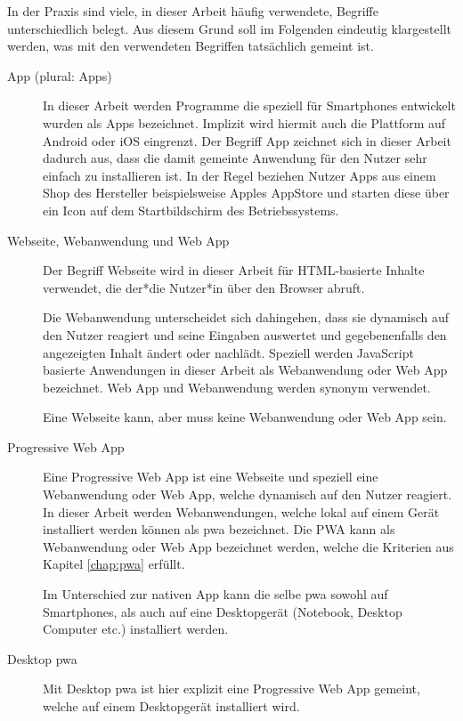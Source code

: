 In der Praxis sind viele, in dieser Arbeit häufig verwendete, Begriffe unterschiedlich belegt. Aus diesem Grund soll im Folgenden eindeutig klargestellt werden, was mit den verwendeten Begriffen tatsächlich gemeint ist.

\begin{description}
	\item [App (plural: Apps)]
		In dieser Arbeit werden Programme die speziell für Smartphones entwickelt wurden als Apps bezeichnet. Implizit wird hiermit auch die Plattform auf Android oder iOS eingrenzt. Der Begriff App zeichnet sich in dieser Arbeit dadurch aus, dass die damit gemeinte Anwendung für den Nutzer sehr einfach zu installieren ist. In der Regel beziehen Nutzer Apps aus einem Shop des Hersteller beispielsweise Apples AppStore und starten diese über ein Icon auf dem Startbildschirm des Betriebssystems.
		
	\item [Webseite, Webanwendung und Web App]
		Der Begriff Webseite wird in dieser Arbeit für HTML-basierte Inhalte verwendet, die der*die Nutzer*in über den Browser abruft.
		
		Die Webanwendung unterscheidet sich dahingehen, dass sie dynamisch auf den Nutzer reagiert und seine Eingaben auswertet und gegebenenfalls den angezeigten Inhalt ändert oder nachlädt. Speziell werden JavaScript basierte Anwendungen in dieser Arbeit als Webanwendung oder Web App bezeichnet. Web App und Webanwendung werden synonym verwendet.
		
		Eine Webseite kann, aber muss keine Webanwendung oder Web App sein.
	
	\item [Progressive Web App]
		Eine Progressive Web App ist eine Webseite und speziell eine Webanwendung oder Web App, welche dynamisch auf den Nutzer reagiert.
		In dieser Arbeit werden Webanwendungen, welche lokal auf einem Gerät installiert werden können als \acf{pwa} bezeichnet. Die PWA kann als Webanwendung oder Web App bezeichnet werden, welche die Kriterien aus Kapitel \ref{chap:pwa} erfüllt.
		
		Im Unterschied zur nativen App kann die selbe \ac{pwa} sowohl auf Smartphones, als auch auf eine Desktopgerät (Notebook, Desktop Computer etc.) installiert werden.
		
	\item [Desktop \ac{pwa}]
		Mit Desktop \ac{pwa} ist hier explizit eine Progressive Web App gemeint, welche auf einem Desktopgerät installiert wird.
			

\end{description}
